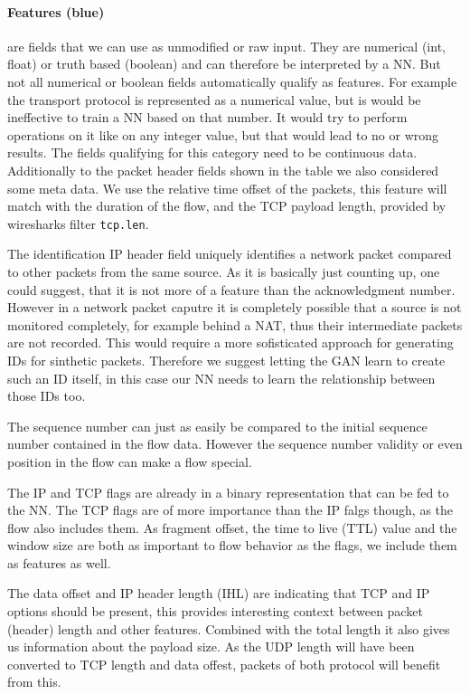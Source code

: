 \documentclass[
	ngerman,
	ruledheaders=section,%
	class=report,%
	thesis={type=bachelor},%
	accentcolor=9c,%
	custommargins=true,%
	marginpar=false,%
	parskip=half-,%
	fontsize=11pt,%
]{tudapub}
\begin{document}
\paragraph{\colorbox{feature}{\textbf{Features} (blue)}} are fields that we can use as unmodified or raw input.
They are numerical (int, float) or truth based (boolean) and can therefore be interpreted by a NN.
But not all numerical or boolean fields automatically qualify as features.
For example the transport protocol is represented as a numerical value, but is would be ineffective to train a NN based on that number.
It would try to perform operations on it like on any integer value, but that would lead to no or wrong results.
The fields qualifying for this category need to be continuous data.
Additionally to the packet header fields shown in the table we also considered some meta data.
We use the relative time offset of the packets, this feature will match with the duration of the flow,
and the TCP payload length, provided by wiresharks filter \lstinline{tcp.len}.

The identification IP header field uniquely identifies a network packet compared to other packets from the same source.
As it is basically just counting up, one could suggest, that it is not more of a feature than the acknowledgment number.
However in a network packet caputre it is completely possible that a source is not monitored completely, for example behind a NAT,
thus their intermediate packets are not recorded.
This would require a more sofisticated approach for generating IDs for sinthetic packets.
Therefore we suggest letting the GAN learn to create such an ID itself, in this case our NN needs to learn the relationship between those IDs too.

The sequence number can just as easily be compared to the initial sequence number contained in the flow data.
However the sequence number validity or even position in the flow can make a flow special.

The IP and TCP flags are already in a binary representation that can be fed to the NN.
The TCP flags are of more importance than the IP falgs though, as the flow also includes them.
As fragment offset, the time to live (TTL) value and the window size are both as important to flow behavior as the flags, we include them as features as well.

The data offset and IP header length (IHL) are indicating that TCP and IP options should be present, this provides interesting context between packet (header) length and other features.
Combined with the total length it also gives us information about the payload size.
As the UDP length will have been converted to TCP length and data offest, packets of both protocol will benefit from this.
\end{document}
